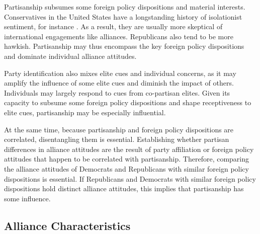 \documentclass[12pt]{article}
\begin{document}


Partisanship subsumes some foreign policy dispositions and material interests. 
Conservatives in the United States have a longstanding history of isolationist sentiment, for instance \citep{Kupchan2020}.
As a result, they are usually more skeptical of international engagements like alliances. 
Republicans also tend to be more hawkish. 
Partisanship may thus encompass the key foreign policy dispositions and dominate individual alliance attitudes. 


Party identification also mixes elite cues and individual concerns, as it may amplify the influence of some elite cues and diminish the impact of others.
Individuals may largely respond to cues from co-partisan elites. 
Given its capacity to subsume some foreign policy dispositions and shape receptiveness to elite cues, partisanship may be especially influential. 


At the same time, because partisanship and foreign policy dispositions are correlated, disentangling them is essential. 
Establishing whether partisan differences in alliance attitudes are the result of party affiliation or foreign policy attitudes that happen to be correlated with partisanship. 
Therefore, comparing the alliance attitudes of Democrats and Republicans with similar foreign policy dispositions is essential. 
If Republicans and Democrats with similar foreign policy dispositions hold distinct alliance attitudes, this implies that partisanship has some influence. 



\subsection{Alliance Characteristics}
\end{document}
